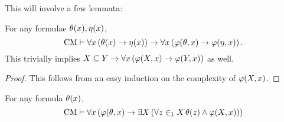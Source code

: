 \documentclass[11pt]{article}
\theoremstyle{plain}
\theoremstyle{definition}
\begin{document}
This will involve a few lemmata:

\begin{lemma}[Positivity]
    \label{lem:pos}
    For any formulae $\theta\mleft(x\mright), \eta\mleft(x\mright)$,
    \[\mathrm{CM} \vdash \forall x \left(\theta\mleft(x\mright) \rightarrow \eta\mleft(x\mright)\right) \rightarrow \forall x \left(\varphi\mleft(\theta, x\mright) \rightarrow \varphi\mleft(\eta, x\mright)\right).\]
    This trivially implies $X \subseteq Y \rightarrow \forall x \left(\varphi\mleft(X, x\mright) \rightarrow \varphi\mleft(Y, x\mright)\right)$ as well.
\end{lemma}

\begin{proof}
    This follows from an easy induction on the complexity of $\varphi\mleft(X, x\mright)$.
\end{proof}

\begin{lemma}
    \label{lem:set-witnesses}
    For any formula $\theta\mleft(x\mright)$,
    \[\mathrm{CM} \vdash \forall x \left(\varphi\mleft(\theta, x\mright) \rightarrow \exists X \left(\forall z \in_1 X \, \theta\mleft(z\mright) \land \varphi\mleft(X, x\mright)\right)\right)\]
\end{lemma}
\end{document}
